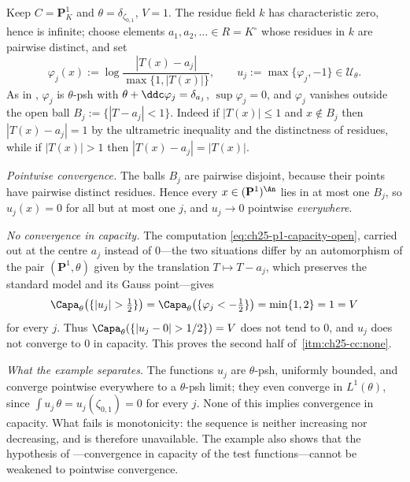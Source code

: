 \begin{example}
\label{ex:ch25-pointwise-not-capacity}
Keep \(C=\mathbf P^1_K\) and \(\theta=\delta_{\zeta_{0,1}}\), \(V=1\).  The
residue field \(k\) has characteristic zero, hence is infinite; choose
elements \(a_1,a_2,\ldots\in R=K^\circ\) whose residues in \(k\) are pairwise
distinct, and set
\[
 \varphi_j(x):=\log\frac{|T(x)-a_j|}{\max\{1,|T(x)|\}},
 \qquad
 u_j:=\max\{\varphi_j,-1\}\in\mathcal U_\theta .
\]
As in , \(\varphi_j\) is \(\theta\)-psh
with \(\theta+\ddc\varphi_j=\delta_{a_j}\), \(\sup\varphi_j=0\), and
\(\varphi_j\) vanishes outside the open ball
\(B_j:=\{|T-a_j|<1\}\).  Indeed if \(|T(x)|\leq1\) and \(x\notin B_j\) then
\(|T(x)-a_j|=1\) by the ultrametric inequality and the distinctness of
residues, while if \(|T(x)|>1\) then \(|T(x)-a_j|=|T(x)|\).

\emph{Pointwise convergence.}  The balls \(B_j\) are pairwise disjoint,
because their points have pairwise distinct residues.  Hence every
\(x\in(\mathbf P^1)^{\An}\) lies in at most one \(B_j\), so \(u_j(x)=0\) for
all but at most one \(j\), and \(u_j\to0\) pointwise \emph{everywhere}.

\emph{No convergence in capacity.}  The computation
\eqref{eq:ch25-p1-capacity-open}, carried out at the centre \(a_j\) instead of
\(0\)---the two situations differ by an automorphism of the pair
\((\mathbf P^1,\theta)\) given by the translation \(T\mapsto T-a_j\), which
preserves the standard model and its Gauss point---gives
\[
 \Capa_\theta\bigl(\{|u_j|>\tfrac12\}\bigr)
 =\Capa_\theta\bigl(\{\varphi_j<-\tfrac12\}\bigr)
 =\min\{1,2\}=1=V
\]
for every \(j\).  Thus \(\Capa_\theta(\{|u_j-0|>1/2\})=V\) does not tend to
\(0\), and \(u_j\) does not converge to \(0\) in capacity.  This proves the
second half of
\,\cref{itm:ch25-cc:none}.

\emph{What the example separates.}  The functions \(u_j\) are
\(\theta\)-psh, uniformly bounded, and converge pointwise everywhere to a
\(\theta\)-psh limit; they even converge in \(L^1(\theta)\), since
\(\int u_j\,\theta=u_j(\zeta_{0,1})=0\) for every \(j\).  None of this
implies convergence in capacity.  What fails is monotonicity: the sequence
is neither increasing nor decreasing, and
 is therefore unavailable.  The
example also shows that the hypothesis of
---convergence in capacity of the test
functions---cannot be weakened to pointwise convergence.
\end{example}

